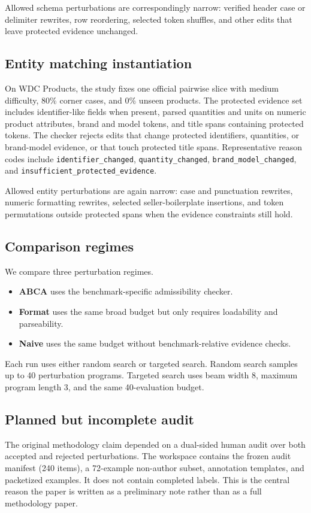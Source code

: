 \documentclass{article}
\newcommand{\abca}{\textsc{ABCA}}
\begin{document}
Allowed schema perturbations are correspondingly narrow: verified header case or delimiter rewrites, row reordering, selected token shuffles, and other edits that leave protected evidence unchanged.

\subsection{Entity matching instantiation}
On WDC Products, the study fixes one official pairwise slice with medium difficulty, $80\%$ corner cases, and $0\%$ unseen products. The protected evidence set includes identifier-like fields when present, parsed quantities and units on numeric product attributes, brand and model tokens, and title spans containing protected tokens. The checker rejects edits that change protected identifiers, quantities, or brand-model evidence, or that touch protected title spans. Representative reason codes include \texttt{identifier\_changed}, \texttt{quantity\_changed}, \texttt{brand\_model\_changed}, and \texttt{insufficient\_protected\_evidence}.

Allowed entity perturbations are again narrow: case and punctuation rewrites, numeric formatting rewrites, selected seller-boilerplate insertions, and token permutations outside protected spans when the evidence constraints still hold.

\subsection{Comparison regimes}
We compare three perturbation regimes.
\begin{itemize}
  \item \textbf{\abca{}} uses the benchmark-specific admissibility checker.
  \item \textbf{Format} uses the same broad budget but only requires loadability and parseability.
  \item \textbf{Naive} uses the same budget without benchmark-relative evidence checks.
\end{itemize}

Each run uses either random search or targeted search. Random search samples up to 40 perturbation programs. Targeted search uses beam width 8, maximum program length 3, and the same 40-evaluation budget.

\subsection{Planned but incomplete audit}
The original methodology claim depended on a dual-sided human audit over both accepted and rejected perturbations. The workspace contains the frozen audit manifest (240 items), a 72-example non-author subset, annotation templates, and packetized examples. It does not contain completed labels. This is the central reason the paper is written as a preliminary note rather than as a full methodology paper.
\end{document}
